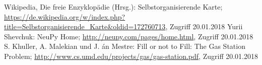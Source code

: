 \documentclass[11pt]{article}
\begin{document}
	
	\begin{thebibliography}{999}
		 Wikipedia, Die freie Enzyklopädie (Hrsg.): Selbstorganisierende Karte; \url{https://de.wikipedia.org/w/index.php?title=Selbstorganisierende_Karte&oldid=172760713}, Zugriff 20.01.2018
		 Yurii Shevchuk: NeuPy Home; \url{http://neupy.com/pages/home.html}, Zugriff 20.01.2018
		 S. Khuller, A. Malekian und J. án Mestre: Fill or not to Fill: The Gas Station Problem; \url{http://www.cs.umd.edu/projects/gas/gas-station.pdf},  Zugriff 20.01.2018
	\end{thebibliography}
	
\end{document}
